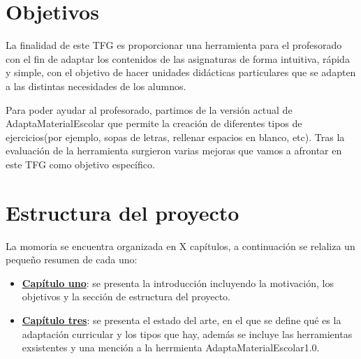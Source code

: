 \section{Objetivos}\label{cap:objetivos}
La finalidad de este TFG es proporcionar una herramienta para el profesorado con el fin de adaptar los contenidos de las asignaturas de forma intuitiva, rápida y simple, con el objetivo de hacer unidades didácticas particulares que se adapten a las distintas necesidades de los alumnos.

Para poder ayudar al profesorado, partimos de la versión actual de AdaptaMaterialEscolar que permite la creación de diferentes tipos de ejercicios(por ejemplo, sopas de letras, rellenar espacios en blanco, etc). Tras la evaluación de la herramienta surgieron varias mejoras que vamos a afrontar en este TFG como objetivo específico. 


\section{Estructura del proyecto}\label{cap:estructura}
La momoria se encuentra organizada en X capítulos, a continuación se relaliza un pequeño resumen de cada uno:
\begin{itemize}
    \item \textbf{\hyperref[ch:introduccion]{Capítulo uno}}: se presenta la introducción incluyendo la motivación, los objetivos y la sección de estructura del proyecto.
    \item \textbf{\hyperref[cap:estadoDelArte]{Capítulo tres}}: se presenta el estado del arte, en el que se define qué es la adaptación curricular y los tipos que hay, además se incluye las herramientas exsistentes y una mención a la herrmienta AdaptaMaterialEscolar1.0.
\end{itemize}